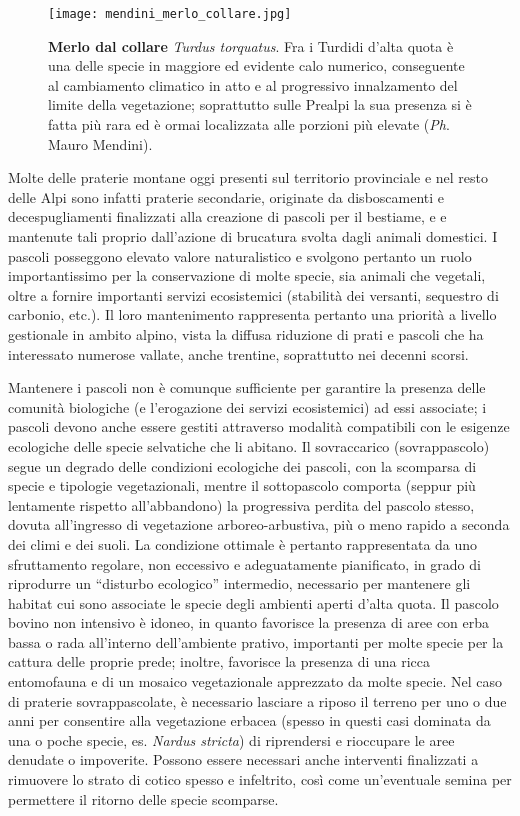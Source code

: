 \documentclass[10pt,twoside,openany,x11names,svgnames,italian,a5paper,dvipsnames,table]{memoir}
\newcommand{\ph}{\emph{Ph}. }
\begin{document}
\begin{wrapfigure}[20]{r}{.6\columnwidth}
\centering
  \texttt{[image: mendini\_merlo\_collare.jpg]}
  \caption*{\textbf{Merlo dal collare} \emph{Turdus torquatus}. Fra i Turdidi d’alta quota è una delle specie in maggiore ed evidente calo numerico, conseguente al cambiamento climatico in atto e al progressivo innalzamento del limite della vegetazione; soprattutto sulle Prealpi la sua presenza si è fatta più rara ed è ormai localizzata alle porzioni più elevate (\ph Mauro Mendini).}
\end{wrapfigure}Molte delle praterie montane oggi presenti sul territorio provinciale e nel resto delle Alpi sono infatti praterie secondarie, originate da disboscamenti e decespugliamenti finalizzati alla creazione di pascoli per il bestiame, e e mantenute tali proprio dall'azione di brucatura svolta dagli animali domestici. I pascoli posseggono elevato valore naturalistico e svolgono pertanto un ruolo importantissimo per la conservazione di molte specie, sia animali che vegetali, oltre a fornire importanti servizi ecosistemici (stabilità dei versanti, sequestro di carbonio, etc.). Il loro mantenimento rappresenta pertanto una priorità a livello gestionale in ambito alpino, vista la diffusa riduzione di prati e pascoli che ha interessato numerose vallate, anche trentine, soprattutto nei decenni scorsi.

Mantenere i pascoli non è comunque sufficiente per garantire la presenza delle comunità biologiche (e l'erogazione dei servizi ecosistemici) ad essi associate; i pascoli devono anche essere gestiti attraverso modalità compatibili con le esigenze ecologiche delle specie selvatiche che li abitano. Il sovraccarico (sovrappascolo) segue un degrado delle condizioni ecologiche dei pascoli, con la scomparsa di specie e tipologie vegetazionali, mentre il sottopascolo comporta (seppur più lentamente rispetto all'abbandono) la progressiva perdita del pascolo stesso, dovuta all’ingresso di vegetazione arboreo-arbustiva, più o meno rapido a seconda dei climi e dei suoli. La condizione ottimale è pertanto rappresentata da uno sfruttamento regolare, non eccessivo e adeguatamente pianificato, in grado di riprodurre un “disturbo ecologico” intermedio, necessario per mantenere gli habitat cui sono associate le specie degli ambienti aperti d'alta quota. Il pascolo bovino non intensivo è idoneo, in quanto favorisce la presenza di aree con erba bassa o rada all'interno dell'ambiente prativo, importanti per molte specie per la cattura delle proprie prede; inoltre, favorisce la presenza di una ricca entomofauna e di un mosaico vegetazionale apprezzato da molte specie. Nel caso di praterie sovrappascolate, è necessario lasciare a riposo il terreno per uno o due anni per consentire alla vegetazione erbacea (spesso in questi casi dominata da una o poche specie, es. \emph{Nardus stricta}) di riprendersi e rioccupare le aree denudate o impoverite. Possono essere necessari anche interventi finalizzati a rimuovere lo strato di cotico spesso e infeltrito, così come un'eventuale semina per permettere il ritorno delle specie scomparse.
\end{document}
